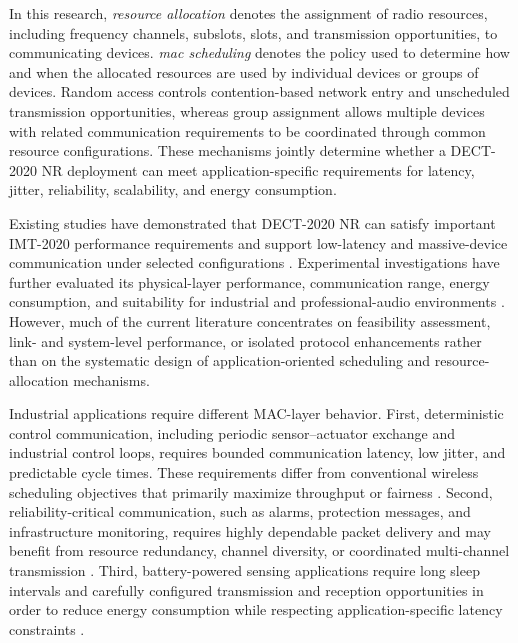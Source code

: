 \documentclass[12pt,a4paper]{article}
\begin{document}
In this research, \textit{resource allocation} denotes the assignment of radio resources, including frequency channels, subslots, slots, and transmission opportunities, to communicating devices. \textit{\gls{mac} scheduling} denotes the policy used to determine how and when the allocated resources are used by individual devices or groups of devices. Random access controls contention-based network entry and unscheduled transmission opportunities, whereas group assignment allows multiple devices with related communication requirements to be coordinated through common resource configurations. These mechanisms jointly determine whether a DECT-2020 NR deployment can meet application-specific requirements for latency, jitter, reliability, scalability, and energy consumption.

Existing studies have demonstrated that DECT-2020 NR can satisfy important IMT-2020 performance requirements and support low-latency and massive-device communication under selected configurations \cite{dhanwaniAssessmentCandidateTechnology2020,pennerURLLCPerformanceEvaluation2021,smidaETSIDECT2020Component2023}. Experimental investigations have further evaluated its physical-layer performance, communication range, energy consumption, and suitability for industrial and professional-audio environments \cite{wassmannPerformanceDECT2020NR2024,haqueDECT2020NRLink2025,grafWhatExpectWhen2026,durreDECT2020NRProfessional2024}. However, much of the current literature concentrates on feasibility assessment, link- and system-level performance, or isolated protocol enhancements rather than on the systematic design of application-oriented scheduling and resource-allocation mechanisms.

Industrial applications require different MAC-layer behavior. First, deterministic control communication, including periodic sensor--actuator exchange and industrial control loops, requires bounded communication latency, low jitter, and predictable cycle times. These requirements differ from conventional wireless scheduling objectives that primarily maximize throughput or fairness \cite{vitturiIndustrialWirelessNetworks2013,popovskiWirelessAccessUltraReliable2018,bennisUltrareliableLowLatencyWireless2018a}. Second, reliability-critical communication, such as alarms, protection messages, and infrastructure monitoring, requires highly dependable packet delivery and may benefit from resource redundancy, channel diversity, or coordinated multi-channel transmission \cite{biswasReliableLowLatencyCommunications2024,glazkovImprovingNearURLLCServices2025,ahmadMACLayerProtocolUltraReliable2025}. Third, battery-powered sensing applications require long sleep intervals and carefully configured transmission and reception opportunities in order to reduce energy consumption while respecting application-specific latency constraints \cite{nihtilaEnergyConsumptionDECT20202022,nihtilaEnergySavingRouter2022,grafWhatExpectWhen2026}.
\end{document}
